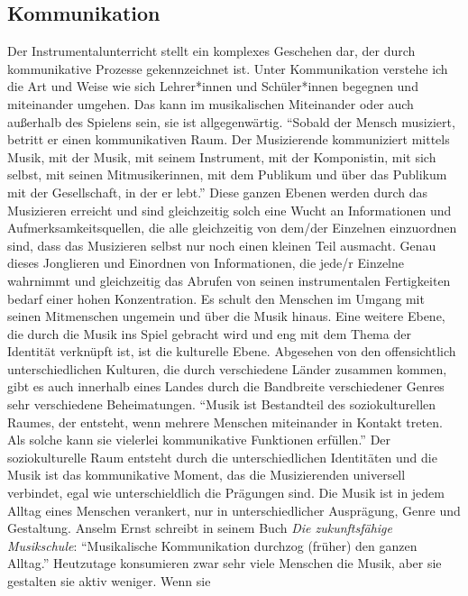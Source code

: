 \subsection{Kommunikation}
Der Instrumentalunterricht stellt ein komplexes Geschehen dar, der durch
kommunikative Prozesse gekennzeichnet ist. Unter Kommunikation verstehe ich die
Art und Weise wie sich Lehrer*innen und Schüler*innen begegnen und miteinander
umgehen. Das kann im musikalischen Miteinander oder auch außerhalb des Spielens
sein, sie ist allgegenwärtig. \enquote{Sobald der Mensch musiziert, betritt er
einen kommunikativen Raum. Der Musizierende kommuniziert mittels Musik, mit der
Musik, mit seinem Instrument, mit der Komponistin, mit sich selbst, mit seinen
Mitmusikerinnen, mit dem Publikum und über das Publikum mit der Gesellschaft, in
der er lebt.} \autocite[56]{doerne:umfassend_musizieren} Diese ganzen Ebenen
werden durch das Musizieren erreicht und sind gleichzeitig solch eine Wucht an
Informationen und Aufmerksamkeitsquellen, die alle gleichzeitig von dem/der
Einzelnen einzuordnen sind, dass das Musizieren selbst nur noch einen kleinen
Teil ausmacht. Genau dieses Jonglieren und Einordnen von Informationen, die
jede/r Einzelne wahrnimmt und gleichzeitig das Abrufen von seinen instrumentalen
Fertigkeiten bedarf einer hohen Konzentration. Es schult den Menschen im Umgang
mit seinen Mitmenschen ungemein und über die Musik hinaus. Eine weitere Ebene,
die durch die Musik ins Spiel gebracht wird und eng mit dem Thema der Identität
verknüpft ist, ist die kulturelle Ebene. Abgesehen von den offensichtlich
unterschiedlichen Kulturen, die durch verschiedene Länder zusammen kommen, gibt
es auch innerhalb eines Landes durch die Bandbreite verschiedener Genres sehr
verschiedene Beheimatungen. \enquote{Musik ist Bestandteil des soziokulturellen
Raumes, der entsteht, wenn mehrere Menschen miteinander in Kontakt treten. Als
solche kann sie vielerlei kommunikative Funktionen erfüllen.}
\autocite[56]{doerne:umfassend_musizieren} Der soziokulturelle Raum entsteht
durch die unterschiedlichen Identitäten und die Musik ist das kommunikative
Moment, das die Musizierenden universell verbindet, egal wie unterschieldlich
die Prägungen sind. Die Musik ist in jedem Alltag eines Menschen verankert, nur
in unterschiedlicher Ausprägung, Genre und Gestaltung. Anselm Ernst schreibt in
seinem Buch \emph{Die zukunftsfähige Musikschule}:
\enquote{Musikalische Kommunikation durchzog (früher) den ganzen Alltag.}
\autocite[37]{ernst:die_zukunftsfaehige_musikschule} Heutzutage konsumieren zwar
sehr viele Menschen die Musik, aber sie gestalten sie aktiv weniger. Wenn sie
